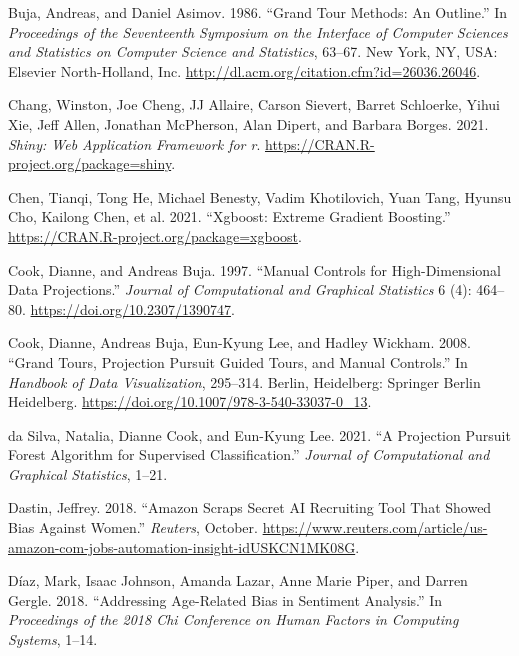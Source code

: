 \documentclass[11pt,twoside]{article}
\newlength{\cslhangindent}
\newlength{\cslentryspacingunit} %
\newenvironment{CSLReferences}[2] %
 {%
  \setlength{\parindent}{0pt}
  \ifodd #1
  \let\oldpar\par
  \def\par{\hangindent=\cslhangindent\oldpar}
  \fi
  \setlength{\parskip}{#2\cslentryspacingunit}
 }%
 {}
\begin{document}
\begin{CSLReferences}{1}{0}
\leavevmode\hypertarget{ref-buja_grand_1986}{}%
Buja, Andreas, and Daniel Asimov. 1986. {``Grand {Tour} {Methods}: {An} {Outline}.''} In \emph{Proceedings of the {Seventeenth} {Symposium} on the {Interface} of {Computer} {Sciences} and {Statistics} on {Computer} {Science} and {Statistics}}, 63--67. New York, NY, USA: Elsevier North-Holland, Inc. \url{http://dl.acm.org/citation.cfm?id=26036.26046}.

\leavevmode\hypertarget{ref-chang_shiny_2021}{}%
Chang, Winston, Joe Cheng, JJ Allaire, Carson Sievert, Barret Schloerke, Yihui Xie, Jeff Allen, Jonathan McPherson, Alan Dipert, and Barbara Borges. 2021. \emph{Shiny: Web Application Framework for r}. \url{https://CRAN.R-project.org/package=shiny}.

\leavevmode\hypertarget{ref-chen_xgboost_2021}{}%
Chen, Tianqi, Tong He, Michael Benesty, Vadim Khotilovich, Yuan Tang, Hyunsu Cho, Kailong Chen, et al. 2021. {``Xgboost: {Extreme} {Gradient} {Boosting}.''} \url{https://CRAN.R-project.org/package=xgboost}.

\leavevmode\hypertarget{ref-cook_manual_1997}{}%
Cook, Dianne, and Andreas Buja. 1997. {``Manual {Controls} for {High}-{Dimensional} {Data} {Projections}.''} \emph{Journal of Computational and Graphical Statistics} 6 (4): 464--80. \url{https://doi.org/10.2307/1390747}.

\leavevmode\hypertarget{ref-cook_grand_2008}{}%
Cook, Dianne, Andreas Buja, Eun-Kyung Lee, and Hadley Wickham. 2008. {``Grand {Tours}, {Projection} {Pursuit} {Guided} {Tours}, and {Manual} {Controls}.''} In \emph{Handbook of {Data} {Visualization}}, 295--314. Berlin, Heidelberg: Springer Berlin Heidelberg. \url{https://doi.org/10.1007/978-3-540-33037-0_13}.

\leavevmode\hypertarget{ref-da_silva_projection_2021}{}%
da Silva, Natalia, Dianne Cook, and Eun-Kyung Lee. 2021. {``A {Projection} {Pursuit} {Forest} {Algorithm} for {Supervised} {Classification}.''} \emph{Journal of Computational and Graphical Statistics}, 1--21.

\leavevmode\hypertarget{ref-dastin_amazon_2018}{}%
Dastin, Jeffrey. 2018. {``Amazon Scraps Secret {AI} Recruiting Tool That Showed Bias Against Women.''} \emph{Reuters}, October. \url{https://www.reuters.com/article/us-amazon-com-jobs-automation-insight-idUSKCN1MK08G}.

\leavevmode\hypertarget{ref-diaz_addressing_2018}{}%
Díaz, Mark, Isaac Johnson, Amanda Lazar, Anne Marie Piper, and Darren Gergle. 2018. {``Addressing Age-Related Bias in Sentiment Analysis.''} In \emph{Proceedings of the 2018 Chi Conference on Human Factors in Computing Systems}, 1--14.


\end{CSLReferences}
\end{document}
